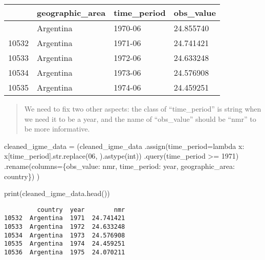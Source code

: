 \documentclass[
  letterpaper,
  DIV=11,
  numbers=noendperiod]{scrreprt}
\newenvironment{Shaded}{\begin{snugshade}}{\end{snugshade}}
\newcommand{\BuiltInTok}[1]{\textcolor[rgb]{0.00,0.23,0.31}{#1}}
\newcommand{\KeywordTok}[1]{\textcolor[rgb]{0.00,0.23,0.31}{#1}}
\newcommand{\NormalTok}[1]{\textcolor[rgb]{0.00,0.23,0.31}{#1}}
\newcommand{\OperatorTok}[1]{\textcolor[rgb]{0.37,0.37,0.37}{#1}}
\newcommand{\StringTok}[1]{\textcolor[rgb]{0.13,0.47,0.30}{#1}}
\begin{document}
\begin{longtable}[]{@{}llll@{}}
\toprule\noalign{}
& geographic\_area & time\_period & obs\_value \\
\midrule\noalign{}
\endhead
\bottomrule\noalign{}
\endlastfoot
10531 & Argentina & 1970-06 & 24.855740 \\
10532 & Argentina & 1971-06 & 24.741421 \\
10533 & Argentina & 1972-06 & 24.633248 \\
10534 & Argentina & 1973-06 & 24.576908 \\
10535 & Argentina & 1974-06 & 24.459251 \\
\end{longtable}

\begin{quote}
We need to fix two other aspects: the class of ``time\_period'' is
string when we need it to be a year, and the name of ``obs\_value''
should be ``nmr'' to be more informative.
\end{quote}

\begin{Shaded}
\begin{Highlighting}[]
\NormalTok{cleaned\_igme\_data }\OperatorTok{=}\NormalTok{ (cleaned\_igme\_data}
\NormalTok{    .assign(time\_period}\OperatorTok{=}\KeywordTok{lambda}\NormalTok{ x: x[}\StringTok{\textquotesingle{}time\_period\textquotesingle{}}\NormalTok{].}\BuiltInTok{str}\NormalTok{.replace(}\StringTok{\textquotesingle{}{-}06\textquotesingle{}}\NormalTok{, }\StringTok{\textquotesingle{}\textquotesingle{}}\NormalTok{).astype(}\BuiltInTok{int}\NormalTok{))}
\NormalTok{    .query(}\StringTok{\textquotesingle{}time\_period \textgreater{}= 1971\textquotesingle{}}\NormalTok{)}
\NormalTok{    .rename(columns}\OperatorTok{=}\NormalTok{\{}\StringTok{\textquotesingle{}obs\_value\textquotesingle{}}\NormalTok{: }\StringTok{\textquotesingle{}nmr\textquotesingle{}}\NormalTok{, }\StringTok{\textquotesingle{}time\_period\textquotesingle{}}\NormalTok{: }\StringTok{\textquotesingle{}year\textquotesingle{}}\NormalTok{, }\StringTok{\textquotesingle{}geographic\_area\textquotesingle{}}\NormalTok{: }\StringTok{\textquotesingle{}country\textquotesingle{}}\NormalTok{\})}
\NormalTok{)}

\BuiltInTok{print}\NormalTok{(cleaned\_igme\_data.head())}
\end{Highlighting}
\end{Shaded}

\begin{verbatim}
         country  year        nmr
10532  Argentina  1971  24.741421
10533  Argentina  1972  24.633248
10534  Argentina  1973  24.576908
10535  Argentina  1974  24.459251
10536  Argentina  1975  24.070211
\end{verbatim}
\end{document}
